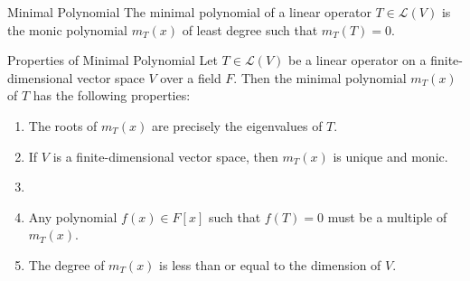 \documentclass[openany]{book}
\begin{document}
\begin{mydefinition}{Minimal Polynomial}
The minimal polynomial of a linear operator $T \in \mathcal{L}(V)$ is the monic polynomial $m_T(x)$ of least degree such that $m_T(T) = 0$. 
\end{mydefinition}
\begin{mytheorem}{Properties of Minimal Polynomial}
Let $T \in \mathcal{L}(V)$ be a linear operator on a finite-dimensional vector space $V$ over a field $F$. Then the minimal polynomial $m_T(x)$ of $T$ has the following properties:
\begin{enumerate}
    \item The roots of $m_T(x)$ are precisely the eigenvalues of $T$.
    \item If $V$ is a finite-dimensional vector space, then $m_T(x)$ is unique and monic.
    \item \item Any polynomial $f(x) \in F[x]$ such that $f(T) = 0$ must be a multiple of $m_T(x)$.
    \item The degree of $m_T(x)$ is less than or equal to the dimension of $V$.
    
\end{enumerate}
\end{mytheorem}
\end{document}
